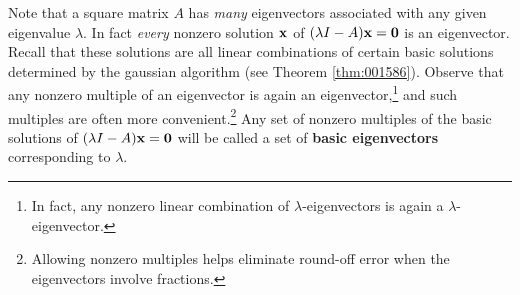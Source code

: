 
Note that a square matrix $A$ has \textit{many} eigenvectors associated with any given eigenvalue $\lambda$. In fact \textit{every} nonzero solution $\textbf{x}$ of $(\lambda I - A)\textbf{x} = \textbf{0}$ is an eigenvector. Recall that these solutions are all linear 
combinations of certain basic solutions determined by the gaussian 
algorithm (see Theorem \ref{thm:001586}). Observe that any nonzero multiple of an eigenvector is again an eigenvector,\footnote{In fact, any nonzero linear combination of $\lambda$-eigenvectors is again a $\lambda$-eigenvector.}
 and such multiples are often more convenient.\footnote{Allowing nonzero multiples helps eliminate round-off error when the eigenvectors involve fractions.}
 Any set of nonzero multiples of the basic solutions of $(\lambda I - A)\textbf{x} = \textbf{0}$ will be called a set of \textbf{basic eigenvectors} corresponding to $\lambda$.


